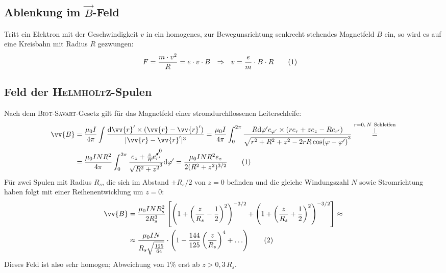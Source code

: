 \documentclass[a4paper,12pt]{article}
\newcommand\numberthis{\addtocounter{equation}{1}\tag{\theequation}}
\newcommand{\kom}{}
\newcommand{\kla}{}
\newcommand{\klam}{}
\begin{document}
\subsection{Ablenkung im $\vec{B}$-Feld}
Tritt ein Elektron mit der Geschwindigkeit $v$ in ein homogenes, zur Bewegunsrichtung senkrecht stehendes Magnetfeld $B$ ein, so wird es auf eine Kreisbahn mit Radius $R$ gezwungen:
\begin{align*}
F&=\frac{m\cdot v^2}{R}=e\cdot v\cdot B\ \ \Rightarrow\ \ v=\frac{e}{m}\cdot B\cdot R  \numberthis\label{v von e/m und B}
\end{align*}
\subsection{Feld der \textsc{Helmholtz}-Spulen}
Nach dem \textsc{Biot-Savart}-Gesetz gilt für das Magnetfeld einer stromdurchflossenen Leiterschleife:
\begin{align*}
\vv{B}&=\frac{\mu_0I}{4\pi}\int\frac{\mathrm{d}\vv{r}'\times(\vv{r}-\vv{r}')}{|\vv{r}-\vv{r}'|^3}=\frac{\mu_0I}{4\pi}\int_0^{2\pi}\frac{R\mathrm{d}\varphi'e_{\varphi'}\times (re_r+ze_z-Re_{r'})}{\sqrt{r^2+R^2+z^2-2rR\cos(\varphi -\varphi ')}^3}\kom\overset{\substack{{r=0,\, N\ \mathrm{Schleifen}} \\ |}}{=}\\
&=\frac{\mu_0INR^2}{4\pi}\int_0^{2\pi}\frac{e_z+\frac{z}{R}\cancelto{0}{e}_{r'}}{\sqrt{R^2+z^2}^3}\mathrm{d}\varphi'=\frac{\mu_0INR^2e_z}{2(R^2+z^2)^{3/2}}\numberthis\label{B von Spule}
\end{align*}
Für zwei Spulen mit Radius $R_s$, die sich im Abstand $\pm R_s/2$ von $z=0$ befinden und die gleiche Windungszahl $N$ sowie Stromrichtung haben folgt mit einer Reihenentwicklung um $z=0$:
\begin{align*}
\vv{B}&=\frac{\mu_0INR_s^2}{2R_s^3}\klam\left[ {\kla\left( {1+\bigg(\frac{z}{R_s}-\frac{1}{2}\bigg)^2} \right)^{-3/2} + \kla\left( {1+\bigg(\frac{z}{R_s}+\frac{1}{2}\bigg)^2} \right)^{-3/2}} \right]\approx\\
&\approx \frac{\mu_0IN}{R_s\sqrt{\frac{125}{64}}}\cdot\kla\left( {1-\frac{144}{125}\kla\left( {\frac{z}{R_s}} \right)^4+\dots} \right) \numberthis\label{B Helmholtzspulen}
\end{align*}
Dieses Feld ist also sehr homogen; Abweichung von 1\% erst ab $z>0,3\,R_s$.
\end{document}
